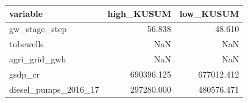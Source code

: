 \begin{tabular}{lrr}
\toprule
variable & high_KUSUM & low_KUSUM \\
\midrule
gw_stage_step & 56.838 & 48.610 \\
tubewells & NaN & NaN \\
agri_grid_gwh & NaN & NaN \\
gsdp_cr & 690396.125 & 677012.412 \\
diesel_pumps_2016_17 & 297280.000 & 480576.471 \\
\bottomrule
\end{tabular}
